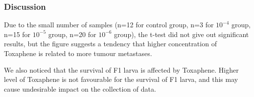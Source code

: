 \subsubsection{Discussion}
Due to the small number of samples (n=12 for control group, n=3 for $10^{-4}$ group, n=15 for $10^{-5}$ group, n=20 for $10^{-6}$ group), the t-test did not give out significant results, but the figure suggests a tendency that higher concentration of Toxaphene is related to more tumour metastases.

We also noticed that the survival of F1 larva is affected by Toxaphene. Higher level of Toxaphene is not favourable for the survival of F1 larva, and this may cause undesirable impact on the collection of data.